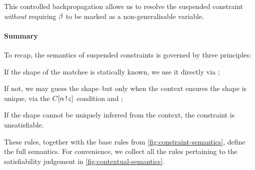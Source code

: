 \documentclass[acmsmall,screen,nonacm]{acmart}
\begin{document}
This controlled backpropagation allows us to resolve the suspended constraint
\emph{without} requiring $\beta$ to be marked as a non-generalisable variable.


\paragraph{Summary}

To recap, the semantics of suspended constraints is governed by three
principles:
\begin{enumerate*}
  \item If the shape of the matchee is statically known, we use it
    directly via ;
  \item If not, we may guess the shape--but only when the context ensures
    the shape is unique, via the $C [\alpha \mathop{!} \varsigma]$ condition and
    ;
  \item If the shape cannot be uniquely inferred from the context, the constraint
    is unsatisfiable.
\end{enumerate*}

These rules, together with the base rules from
\cref{fig:constraint-semantics}, define the full semantics. For convenience,
we collect all the rules pertaining to the satisfiability judgement in
\cref{fig:contextual-semantics}.
\end{document}
